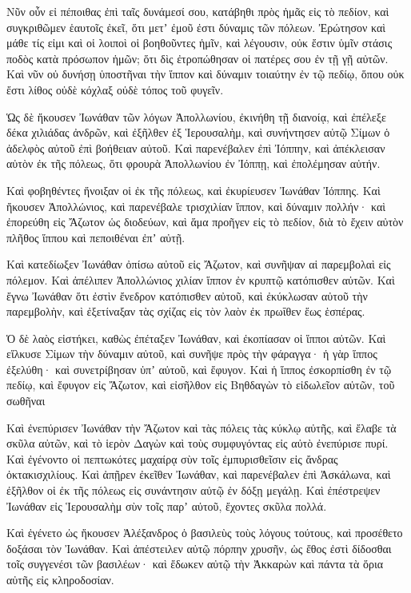 {\par }{\PP {}Νῦν οὖν εἰ πέποιθας ἐπὶ ταῖς δυνάμεσί σου, κατάβηθι πρὸς ἡμᾶς εἰς τὸ πεδίον, καὶ συγκριθῶμεν ἑαυτοῖς ἐκεῖ, ὅτι μετʼ ἐμοῦ ἐστι δύναμις τῶν πόλεων.
Ἐρώτησον καὶ μάθε τίς εἰμι καὶ οἱ λοιποὶ οἱ βοηθοῦντες ἡμῖν, καὶ λέγουσιν, οὐκ ἔστιν ὑμῖν στάσις ποδὸς κατὰ πρόσωπον ἡμῶν; ὅτι δὶς ἐτροπώθησαν οἱ πατέρες σου ἐν τῇ γῇ αὐτῶν.
Καὶ νῦν οὐ δυνήσῃ ὑποστῆναι τὴν ἵππον καὶ δύναμιν τοιαύτην ἐν τῷ πεδίῳ, ὅπου οὐκ ἔστι λίθος οὐδὲ κόχλαξ οὐδὲ τόπος τοῦ φυγεῖν.
\par }{\PP {}Ὡς δὲ ἤκουσεν Ἰωνάθαν τῶν λόγων Ἀπολλωνίου, ἐκινήθη τῇ διανοίᾳ, καὶ ἐπέλεξε δέκα χιλιάδας ἀνδρῶν, καὶ ἐξῆλθεν ἐξ Ἱερουσαλὴμ, καὶ συνήντησεν αὐτῷ Σίμων ὁ ἀδελφὸς αὐτοῦ ἐπὶ βοήθειαν αὐτοῦ.
Καὶ παρενέβαλεν ἐπὶ Ἰόππην, καὶ ἀπέκλεισαν αὐτὸν ἐκ τῆς πόλεως, ὅτι φρουρὰ Ἀπολλωνίου ἐν Ἰόππῃ, καὶ ἐπολέμησαν αὐτήν.
\par }{\PP {}Καὶ φοβηθέντες ἤνοιξαν οἱ ἐκ τῆς πόλεως, καὶ ἐκυρίευσεν Ἰωνάθαν Ἰόππης.
Καὶ ἤκουσεν Ἀπολλώνιος, καὶ παρενέβαλε τρισχιλίαν ἵππον, καὶ δύναμιν πολλήν· καὶ ἐπορεύθη εἰς Ἄζωτον ὡς διοδεύων, καὶ ἅμα προῆγεν εἰς τὸ πεδίον, διὰ τὸ ἔχειν αὐτὸν πλῆθος ἵππου καὶ πεποιθέναι ἐπʼ αὐτῇ.
\par }{\PP {}Καὶ κατεδίωξεν Ἰωνάθαν ὀπίσω αὐτοῦ εἰς Ἄζωτον, καὶ συνῆψαν αἱ παρεμβολαὶ εἰς πόλεμον.
Καὶ ἀπέλιπεν Ἀπολλώνιος χιλίαν ἵππον ἐν κρυπτῷ κατόπισθεν αὐτῶν.
Καὶ ἔγνω Ἰωνάθαν ὅτι ἐστὶν ἔνεδρον κατόπισθεν αὐτοῦ, καὶ ἐκύκλωσαν αὐτοῦ τὴν παρεμβολὴν, καὶ ἐξετίναξαν τὰς σχίζας εἰς τὸν λαὸν ἐκ πρωΐθεν ἕως ἑσπέρας.
\par }{\PP {}Ὁ δὲ λαὸς εἱστήκει, καθὼς ἐπέταξεν Ἰωνάθαν, καὶ ἐκοπίασαν οἱ ἵπποι αὐτῶν.
Καὶ εἵλκυσε Σίμων τὴν δύναμιν αὐτοῦ, καὶ συνῆψε πρὸς τὴν φάραγγα· ἡ γὰρ ἵππος ἐξελύθη· καὶ συνετρίβησαν ὑπʼ αὐτοῦ, καὶ ἔφυγον.
Καὶ ἡ ἵππος ἐσκορπίσθη ἐν τῷ πεδίῳ, καὶ ἔφυγον εἰς Ἄζωτον, καὶ εἰσῆλθον εἰς Βηθδαγὼν τὸ εἰδωλεῖον αὐτῶν, τοῦ σωθῆναι
\par }{\PP {}Καὶ ἐνεπύρισεν Ἰωνάθαν τὴν Ἄζωτον καὶ τὰς πόλεις τὰς κύκλῳ αὐτῆς, καὶ ἔλαβε τὰ σκῦλα αὐτῶν, καὶ τὸ ἱερὸν Δαγὼν καὶ τοὺς συμφυγόντας εἰς αὐτὸ ἐνεπύρισε πυρί.
Καὶ ἐγένοντο οἱ πεπτωκότες μαχαίρᾳ σὺν τοῖς ἐμπυρισθεῖσιν εἰς ἄνδρας ὀκτακισχιλίους.
Καὶ ἀπῇρεν ἐκεῖθεν Ἰωνάθαν, καὶ παρενέβαλεν ἐπὶ Ἀσκάλωνα, καὶ ἐξῆλθον οἱ ἐκ τῆς πόλεως εἰς συνάντησιν αὐτῷ ἐν δόξῃ μεγάλῃ.
Καὶ ἐπέστρεψεν Ἰωνάθαν εἰς Ἱερουσαλὴμ σὺν τοῖς παρʼ αὐτοῦ, ἔχοντες σκῦλα πολλά.
\par }{\PP {}Καὶ ἐγένετο ὡς ἤκουσεν Ἀλέξανδρος ὁ βασιλεὺς τοὺς λόγους τούτους, καὶ προσέθετο δοξάσαι τὸν Ἰωνάθαν.
Καὶ ἀπέστειλεν αὐτῷ πόρπην χρυσῆν, ὡς ἔθος ἐστὶ δίδοσθαι τοῖς συγγενέσι τῶν βασιλέων· καὶ ἔδωκεν αὐτῷ τὴν Ἀκκαρὼν καὶ πάντα τὰ ὅρια αὐτῆς εἰς κληροδοσίαν.

}
